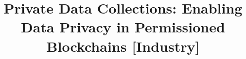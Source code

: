 \documentclass[sigconf, nonacm]{acmart}
\begin{document}

\title{Private Data Collections: Enabling Data Privacy in Permissioned Blockchains [Industry]}


%
%
%
%

\end{document}
